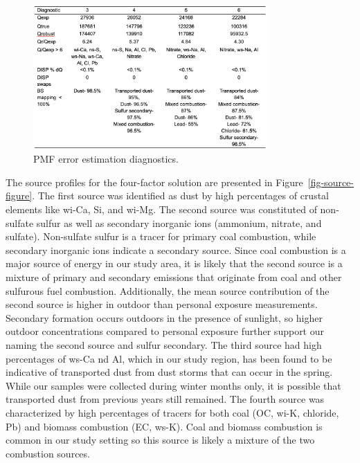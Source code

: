 \documentclass[
  letterpaper,
  DIV=11,
  numbers=noendperiod]{scrartcl}
\begin{document}
\begin{figure}[H]

{\centering \includegraphics[width=0.8\textwidth,height=\textheight]{images/source-table.png}

}

\caption{\label{fig-source-table}PMF error estimation diagnostics.}

\end{figure}

The source profiles for the four-factor solution are presented in
Figure~\ref{fig-source-figure}. The first source was identified as dust
by high percentages of crustal elements like wi-Ca, Si, and wi-Mg. The
second source was constituted of non-sulfate sulfur as well as secondary
inorganic ions (ammonium, nitrate, and sulfate). Non-sulfate sulfur is a
tracer for primary coal combustion, while secondary inorganic ions
indicate a secondary source. Since coal combustion is a major source of
energy in our study area, it is likely that the second source is a
mixture of primary and secondary emissions that originate from coal and
other sulfurous fuel combustion. Additionally, the mean source
contribution of the second source is higher in outdoor than personal
exposure measurements. Secondary formation occurs outdoors in the
presence of sunlight, so higher outdoor concentrations compared to
personal exposure further support our naming the second source and
sulfur secondary. The third source had high percentages of ws-Ca nd Al,
which in our study region, has been found to be indicative of
transported dust from dust storms that can occur in the spring. While
our samples were collected during winter months only, it is possible
that transported dust from previous years still remained. The fourth
source was characterized by high percentages of tracers for both coal
(OC, wi-K, chloride, Pb) and biomass combustion (EC, ws-K). Coal and
biomass combustion is common in our study setting so this source is
likely a mixture of the two combustion sources.
\end{document}
